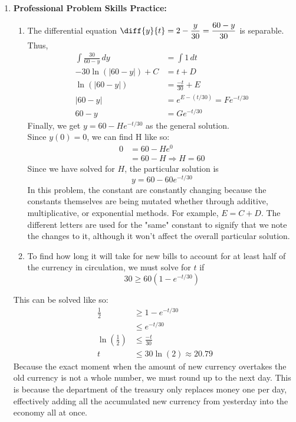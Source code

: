 \documentclass{article}
\begin{document}
\begin{enumerate}[label=\textbf{(2.\arabic*)}]
\newpage

\item \textbf{Professional Problem Skills Practice:}

\vspace{10pt}
\begin{enumerate}

\item The differential equation $\diff{y}{t} = 2-\dfrac{y}{30}=\dfrac{60-y}{30}$ is separable. Thus, 
\begin{align*}
\int \frac{30}{60-y}\,dy &= \int1\,dt\\
-30\ln(|60-y|)+C &= t+D\\
\ln(|60-y|) &= \frac{-t}{30}+E\\
|60-y| &= e^{E-(t/30)} = Fe^{-t/30}\\
60-y&=Ge^{-t/30}
\end{align*}
Finally, we get $y=60-He^{-t/30}$ as the general solution.\\

Since $y(0)=0$, we can find H like so:
\begin{align*}
0&=60-He^0\\
&= 60-H \Rightarrow H=60
\end{align*}
Since we have solved for $H$, the particular solution is 
\begin{equation}
y=60-60e^{-t/30}
\end{equation}
In this problem, the constant are constantly changing because the constants themselves are being mutated whether through additive, multiplicative, or exponential methods. For example, $E=C+D$. The different letters are used for the "same" constant to signify that we note the changes to it, although it won't affect the overall particular solution.\\



\item To find how long it will take for new bills to account for at least half of the currency in circulation, we must solve for $t$ if
\[30\ge60\left(1-e^{-t/30}\right)\]
\end{enumerate}
This can be solved like so:
\begin{align*}
\frac{1}{2}&\ge 1-e^{-t/30}\\
&\le e^{-t/30}\\
\ln\left(\frac{1}{2}\right) &\le \frac{-t}{30}\\
t&\le 30\ln(2)\approx 20.79
\end{align*}
Because the exact moment when the amount of new currency overtakes the old currency is not a whole number, we must round up to the next day. This is because the department of the treasury only replaces money one per day, effectively adding all the accumulated new currency from yesterday into the economy all at once. 
\end{enumerate}
\end{document}

